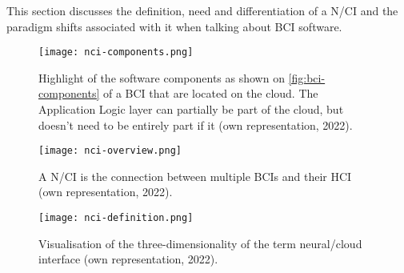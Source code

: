 This section discusses the definition, need and differentiation of a N/CI and the paradigm shifts associated with it when talking about BCI software.

\begin{figure}[!ht]
  \centering
  \texttt{[image: nci-components.png]}
  \caption{Highlight of the software components as shown on \autoref{fig:bci-components} of a BCI that are located on the cloud. The Application Logic layer can partially be part of the cloud, but doesn't need to be entirely part if it (own representation, 2022).}
  \label{fig:nci-components}
\end{figure}


\begin{figure}[!ht]
  \centering
  \texttt{[image: nci-overview.png]}
  \caption{A N/CI is the connection between multiple BCIs and their HCI (own representation, 2022).}
  \label{fig:nci-overview}
\end{figure}

\begin{figure}[!ht]
  \centering
  \texttt{[image: nci-definition.png]}
  \caption{Visualisation of the three-dimensionality of the term neural/cloud interface (own representation, 2022).}
  \label{fig:nci-definition}
\end{figure}




